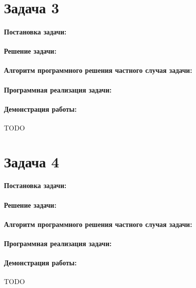 {
   \section*{Задача 3}
   \paragraph{Постановка задачи:}
   \paragraph{Решение задачи:}
   \paragraph{Алгоритм программного решения частного случая задачи:}
   \paragraph{Программная реализация задачи:}
   \paragraph{Демонстрация работы:}
   TODO %
}
{
   \section*{Задача 4}
   \paragraph{Постановка задачи:}
   \paragraph{Решение задачи:}
   \paragraph{Алгоритм программного решения частного случая задачи:}
   \paragraph{Программная реализация задачи:}
   \paragraph{Демонстрация работы:}
   TODO %
}
